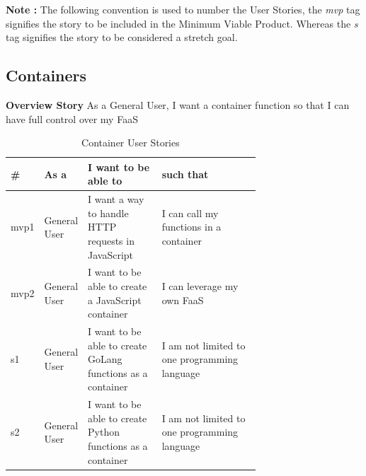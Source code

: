 \clearpage

\textbf{Note : }The following convention is used to number the User Stories, the \textit{mvp} tag signifies the story to be included in the Minimum Viable Product. Whereas the \textit{s} tag signifies the story to be considered a stretch goal.

\subsection{Containers}
\textbf{Overview Story}
\newline As a General User, I want a container function so that I can have full control over my FaaS
\begin{table}[!ht]
\begin{tabular}{|l|l|p{0.3\linewidth}|p{0.4\linewidth}|}
\hline
\textbf{\#} & \textbf{As a} & \textbf{I want to be able to}                               & \textbf{such that}                           \\ \hline
mvp1        & General User  & I want a way to handle HTTP requests in JavaScript          & I can call my functions in a container       \\ \hline
mvp2        & General User  & I want to be able to create a JavaScript container          & I can leverage my own FaaS                   \\ \hline
s1          & General User  & I want to be able to create GoLang functions as a container & I am not limited to one programming language \\ \hline
s2          & General User  & I want to be able to create Python functions as a container & I am not limited to one programming language \\ \hline
\end{tabular}
\caption{Container User Stories}
\label{tab:container}
\end{table}


